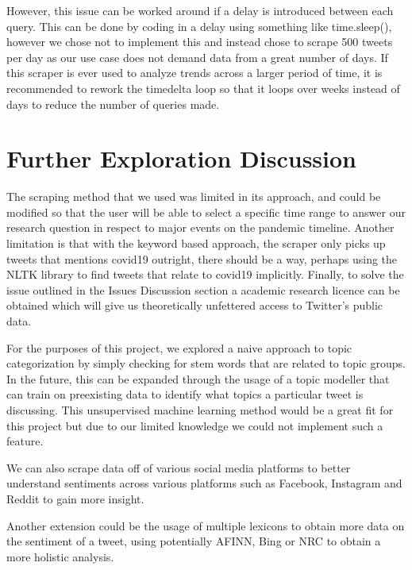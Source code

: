 \documentclass[fontsize=11pt]{article}
\begin{document}
However, this issue can be worked around if a delay is introduced between each query. This can be done by coding in a delay using something like time.sleep(), however we chose not to implement this and instead chose to scrape 500 tweets per day as our use case does not demand data from a great number of days. If this scraper is ever used to analyze trends across a larger period of time, it is recommended to rework the timedelta loop so that it loops over weeks instead of days to reduce the number of queries made.

\section*{Further Exploration Discussion}
The scraping method that we used was limited in its approach, and could be modified so that the user will be able to select a specific time range to answer our research question in respect to major events on the pandemic timeline. Another limitation is that with the keyword based approach, the scraper only picks up tweets that mentions covid19 outright, there should be a way, perhaps using the NLTK library to find tweets that relate to covid19 implicitly. Finally, to solve the issue outlined in the Issues Discussion section a academic research licence can be obtained which will give us theoretically unfettered access to Twitter's public data.

For the purposes of this project, we explored a naive approach to topic categorization by simply checking for stem words that are related to topic groups. In the future, this can be expanded through the usage of a topic modeller that can train on preexisting data to identify what topics a particular tweet is discussing. This unsupervised machine learning method would be a great fit for this project but due to our limited knowledge we could not implement such a feature.

We can also scrape data off of various social media platforms to better understand sentiments across various platforms such as Facebook, Instagram and Reddit to gain more insight.

Another extension could be the usage of multiple lexicons to obtain more data on the sentiment of a tweet, using potentially AFINN, Bing or NRC to obtain a more holistic analysis.



\end{document}
